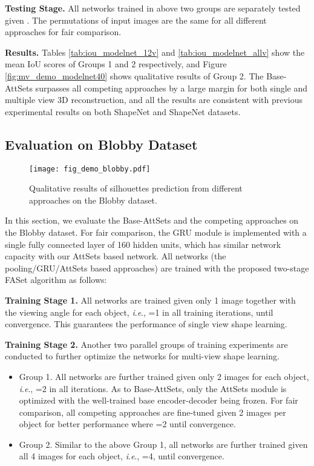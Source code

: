 \documentclass[twocolumn]{svjour3}    \pdfoutput=1
\newcommand{\nickname}{AttSets}
\newcommand{\faset}{FASet}
\newcommand{\ie}{\textit{i}.\textit{e}., }
\newcommand{\rev}{}
\begin{document}
\textbf{Testing Stage.} All networks trained in above two groups are separately tested given . The permutations of input images are the same for all different approaches for fair comparison.

\textbf{Results.} Tables \ref{tab:iou_modelnet_12v} and \ref{tab:iou_modelnet_allv} show the mean IoU scores of Groups 1 and 2 respectively, and Figure \ref{fig:mv_demo_modelnet40} shows qualitative results of Group 2. The Base-AttSets surpasses all competing approaches by a large margin for both single and multiple view 3D reconstruction, and all the results are consistent with previous experimental results on both ShapeNet and ShapeNet datasets. 

\vspace{-0.45cm}
\subsection{Evaluation on Blobby Dataset}\label{sec:eval_blobby}
\begin{figure*}[t]
\centering
   \texttt{[image: fig\_demo\_blobby.pdf]}
\caption{Qualitative results of silhouettes prediction from different approaches on the Blobby dataset.}
\label{fig:mv_demo_blobby}
\vspace{-0.1cm}
\end{figure*}
In this section, we evaluate the Base-AttSets and the competing approaches on the Blobby dataset. For fair comparison, the GRU module is implemented with a single fully connected layer of 160 hidden units, which has similar network capacity with our \nickname{} based network. All networks \rev{(the pooling/GRU/\nickname{} based approaches)} are trained with the proposed two-stage \faset{} algorithm as follows:

\textbf{Training Stage 1.} All networks are trained given only 1 image together with the viewing angle for each object, \ie =1 in all training iterations, until convergence. This guarantees the performance of single view shape learning. 

\textbf{Training Stage 2.} Another two parallel groups of training experiments are conducted to further optimize the networks for multi-view shape learning.
\vspace{-0.2cm}
\begin{itemize}[leftmargin=0.2cm]
\item Group 1. All networks are further trained given only 2 images for each object, \ie =2 in all iterations. As to Base-AttSets, only the \nickname{} module is optimized with the well-trained base encoder-decoder being frozen. For fair comparison, all competing approaches are fine-tuned given 2 images per object for better performance where  =2 until convergence.
\item Group 2. Similar to the above Group 1, all networks are further trained given all 4 images for each object, \ie =4, until convergence.
\end{itemize}
\end{document}
